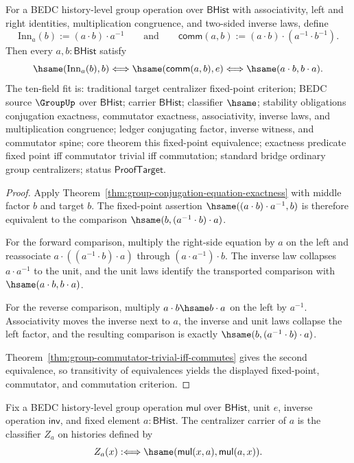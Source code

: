 \begin{theorem}
\label{thm:group-commutator-fixed-point-criterion}
For a BEDC history-level group operation over $\mathsf{BHist}$ with
associativity, left and right identities, multiplication congruence, and
two-sided inverse laws, define
$$
\mathrm{Inn}_a(b):=(a\cdot b)\cdot a^{-1}
\qquad\text{and}\qquad
\mathsf{comm}(a,b):=(a\cdot b)\cdot(a^{-1}\cdot b^{-1}).
$$
Then every $a,b:\mathsf{BHist}$ satisfy
$$
\hsame(\mathrm{Inn}_a(b),b)
\Longleftrightarrow
\hsame(\mathsf{comm}(a,b),e)
\Longleftrightarrow
\hsame(a\cdot b,b\cdot a).
$$
The ten-field fit is: traditional target centralizer fixed-point criterion;
BEDC source $\GroupUp$ over $\mathsf{BHist}$; carrier $\mathsf{BHist}$;
classifier $\hsame$; stability obligations conjugation exactness,
commutator exactness, associativity, inverse laws, and multiplication
congruence; ledger conjugating factor, inverse witness, and commutator spine;
core theorem this fixed-point equivalence; exactness predicate fixed point iff
commutator trivial iff commutation; standard bridge ordinary group
centralizers; status $\mathsf{ProofTarget}$.
\end{theorem}
\begin{proof}
Apply Theorem~\ref{thm:group-conjugation-equation-exactness} with middle
factor $b$ and target $b$. The fixed-point assertion
$\hsame((a\cdot b)\cdot a^{-1},b)$ is therefore equivalent to the comparison
$\hsame(b,(a^{-1}\cdot b)\cdot a)$.

For the forward comparison, multiply the right-side equation by $a$ on the
left and reassociate $a\cdot((a^{-1}\cdot b)\cdot a)$ through
$(a\cdot a^{-1})\cdot b$. The inverse law collapses $a\cdot a^{-1}$ to the
unit, and the unit laws identify the transported comparison with
$\hsame(a\cdot b,b\cdot a)$.

For the reverse comparison, multiply $a\cdot b\hsame b\cdot a$ on the left by
$a^{-1}$. Associativity moves the inverse next to $a$, the inverse and unit
laws collapse the left factor, and the resulting comparison is exactly
$\hsame(b,(a^{-1}\cdot b)\cdot a)$.

Theorem~\ref{thm:group-commutator-trivial-iff-commutes} gives the second
equivalence, so transitivity of equivalences yields the displayed
fixed-point, commutator, and commutation criterion.
\end{proof}

\begin{definition}
\label{def:group-centralizer-carrier}
Fix a BEDC history-level group operation $\mathsf{mul}$ over
$\mathsf{BHist}$, unit $e$, inverse operation $\mathsf{inv}$, and fixed
element $a:\mathsf{BHist}$. The centralizer carrier of $a$ is the classifier
$Z_a$ on histories defined by
$$
Z_a(x) :\Longleftrightarrow
\hsame(\mathsf{mul}(x,a),\mathsf{mul}(a,x)).
$$
\end{definition}

